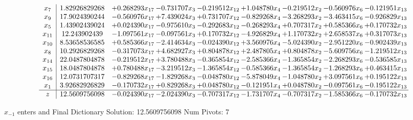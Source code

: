 \documentclass[10pt]{article}
\begin{document}
 \[\begin{array}{c| c c@{\hskip 2pt} c@{\hskip 2pt} c@{\hskip 2pt} c@{\hskip 2pt} c@{\hskip 2pt} c@{\hskip 2pt} c@{\hskip 2pt} }
 x_{7}   &  1.82926829268 & + 0.268293 x_{17} & -0.731707 x_{3} & -0.219512 x_{12} & + 1.048780 x_{4} & -0.219512 x_{2} & -0.560976 x_{6} & -0.121951 x_{13}\\
 x_{9}   &  17.9024390244 & -0.560976 x_{17} & + 7.439024 x_{3} & + 0.731707 x_{12} & -0.829268 x_{4} & -3.268293 x_{2} & -3.463415 x_{6} & -0.926829 x_{13}\\
 x_{5}   &  1.43902439024 & + 0.024390 x_{17} & -0.975610 x_{3} & -0.292683 x_{12} & -0.268293 x_{4} & + 0.707317 x_{2} & + 0.585366 x_{6} & + 0.170732 x_{13}\\
 x_{11}   &  12.243902439 & -1.097561 x_{17} & -0.097561 x_{3} & + 0.170732 x_{12} & -4.926829 x_{4} & + 1.170732 x_{2} & + 2.658537 x_{6} & + 0.317073 x_{13}\\
 x_{10}   &  8.53658536585 & + 0.585366 x_{17} & -2.414634 x_{3} & -0.024390 x_{12} & + 3.560976 x_{4} & -5.024390 x_{2} & -2.951220 x_{6} & -0.902439 x_{13}\\
 x_{8}   &  10.2926829268 & -0.317073 x_{17} & + 4.682927 x_{3} & + 0.804878 x_{12} & + 2.487805 x_{4} & + 0.804878 x_{2} & -5.609756 x_{6} & -1.219512 x_{13}\\
 x_{14}   &  22.0487804878 & -0.219512 x_{17} & + 3.780488 x_{3} & -0.365854 x_{12} & -2.585366 x_{4} & -1.365854 x_{2} & -2.268293 x_{6} & -0.536585 x_{13}\\
 x_{15}   &  18.0487804878 & + 0.780488 x_{17} & -3.219512 x_{3} & -1.365854 x_{12} & -0.585366 x_{4} & -1.365854 x_{2} & -1.268293 x_{6} & + 0.463415 x_{13}\\
 x_{16}   &  12.0731707317 & -0.829268 x_{17} & -1.829268 x_{3} & -0.048780 x_{12} & -5.878049 x_{4} & -1.048780 x_{2} & + 3.097561 x_{6} & + 0.195122 x_{13}\\
 x_{1}   &  3.92682926829 & -0.170732 x_{17} & + 0.829268 x_{3} & + 0.048780 x_{12} & -0.121951 x_{4} & + 0.048780 x_{2} & -0.097561 x_{6} & -0.195122 x_{13}\\
\hline
z    &  12.5609756098 & -0.024390 x_{17} & -2.024390 x_{3} & -0.707317 x_{12} & -1.731707 x_{4} & -0.707317 x_{2} & -1.585366 x_{6} & -0.170732 x_{13}\\
\end{array}\]


 $ x_{-1} $ enters and Final Dictionary
Solution:  12.5609756098
Num Pivots:  7
\end{document}
